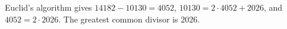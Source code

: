Euclid's algorithm gives $14182-10130=4052$, $10130=2\cdot4052+2026$, and $4052=2\cdot2026$. The greatest common divisor is $\boxed{2026}$.
